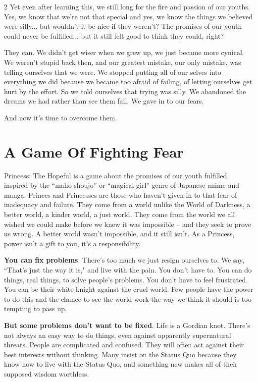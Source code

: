 \begin{multicols}{2}
Yet even after learning this, we still long for the fire and passion of our youths. Yes, we know that we're not that special and yes, we know the things we believed were silly... but wouldn't it be nice if they weren't? The promises of our youth could never be fulfilled... but it still felt good to think they could, right?

They can. We didn't get wiser when we grew up, we just became more cynical. We weren't stupid back then, and our greatest mistake, our only mistake, was telling ourselves that we were. We stopped putting all of our selves into everything we did because we became too afraid of failing, of letting ourselves get hurt by the effort. So we told ourselves that trying was silly. We abandoned the dreams we had rather than see them fail. We gave in to our fears.

And now it's time to overcome them.

\section*{A Game Of Fighting Fear}

Princess: The Hopeful is a game about the promises of our youth fulfilled, inspired by the “maho shoujo” or “magical girl” genre of Japanese anime and manga. Princes and Princesses are those who haven't given in to that fear of inadequacy and failure. They come from a world unlike the World of Darkness, a better world, a kinder world, a just world. They come from the world we all wished we could make before we knew it was impossible – and they seek to prove us wrong. A better world wasn't impossible, and it still isn't. As a Princess, power isn't a gift to you, it's a responsibility.

\textbf{You can fix problems}. There's too much we just resign ourselves to. We say, \textquotedblleft That's just the way it is," and live with the pain. You don't have to. You can do things, real things, to solve people's problems. You don't have to feel frustrated. You can be their white knight against the cruel world. Few people have the power to do this and the chance to see the world work the way we think it should is too tempting to pass up.

\textbf{But some problems don't want to be fixed}. Life is a Gordian knot. There's not always an easy way to do things, even against apparently supernatural threats. People are complicated and confused. They will often act against their best interests without thinking. Many insist on the Status Quo because they know how to live with the Status Quo, and something new makes all of their supposed wisdom worthless.


\end{multicols}
